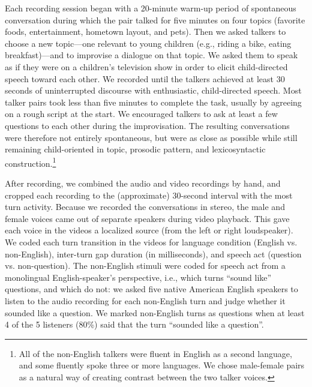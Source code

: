 \documentclass[authoryear, 12pt]{elsarticle}
\begin{document}
Each recording session began with a 20-minute warm-up period of spontaneous conversation during which the pair talked for five minutes on four topics (favorite foods, entertainment, hometown layout, and pets). Then we asked talkers to choose a new topic---one relevant to young children (e.g., riding a bike, eating breakfast)---and to improvise a dialogue on that topic. We asked them to speak as if they were on a children's television show in order to elicit child-directed speech toward each other. We recorded until the talkers achieved at least 30 seconds of uninterrupted discourse with enthusiastic, child-directed speech. Most talker pairs took less than five minutes to complete the task, usually by agreeing on a rough script at the start. We encouraged talkers to ask at least a few questions to each other during the improvisation. The resulting conversations were therefore not entirely spontaneous, but were as close as possible while still remaining child-oriented in topic, prosodic pattern, and lexicosyntactic construction.\footnote{All of the non-English talkers were fluent in English as a second language, and some fluently spoke three or more languages. We chose male-female pairs as a natural way of creating contrast between the two talker voices.}

After recording, we combined the audio and video recordings by hand, and cropped each recording to the (approximate) 30-second interval with the most turn activity. Because we recorded the conversations in stereo, the male and female voices came out of separate speakers during video playback. This gave each voice in the videos a localized source (from the left or right loudspeaker). We coded each turn transition in the videos for language condition (English vs. non-English), inter-turn gap duration (in milliseconds), and speech act (question vs. non-question). The non-English stimuli were coded for speech act from a monolingual English-speaker's perspective, i.e., which turns ``sound like'' questions, and which do not: we asked five native American English speakers to listen to the audio recording for each non-English turn and judge whether it sounded like a question. We marked non-English turns as questions when at least 4 of the 5 listeners (80\%) said that the turn ``sounded like a question''.
\end{document}
